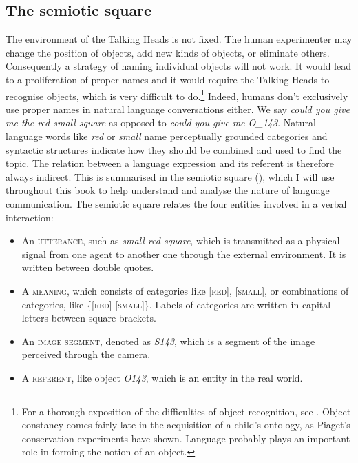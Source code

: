 \subsection{The semiotic square}

The environment of the Talking Heads is 
not fixed. The human experimenter 
may change the position of objects, add new kinds of 
objects, or eliminate
others. Consequently a strategy of naming individual objects
will not work. It would lead to a proliferation of 
proper names and it would require the Talking Heads to
recognise objects, which is very difficult to do.\footnote{For a thorough exposition of the difficulties of 
object recognition, see \cite{Ullman:1996}. 
Object constancy comes fairly late in the 
acquisition of a child's ontology, as Piaget's conservation
experiments have shown. Language probably plays an important
role in forming the notion of an object.}
Indeed, humans don't exclusively use proper names in 
natural language conversations 
either. We say \textit{could you give me the red small square} as 
opposed to \textit{could you give me O\_143}. Natural language
words like \textit{red} or \textit{small} name perceptually grounded categories
and syntactic structures indicate how they should
be combined and used to find the topic. The relation between 
a language expression and its referent is therefore 
always indirect. This is summarised
in the semiotic square (), which I will use throughout this book to 
help understand and analyse the nature of language communication. 
The semiotic square relates the four entities
involved in a verbal interaction: 
\begin{itemize}
\item An {\scshape utterance}, such as \textit{small red square}, which is 
transmitted as a physical 
signal from one agent to another one through the 
external environment. It is written between double quotes. 
\item A {\scshape meaning}, which consists of categories like [\textsc{red}], [\textsc{small}], 
or combinations of categories, like \{[\textsc{red}] [\textsc{small}]\}. Labels of 
categories are written in capital letters between 
square brackets. 
\clearpage
\item An {\scshape image segment}, denoted as \emph{S143}, which is 
a segment of the image perceived through the camera.
\item A {\scshape referent}, like object \emph{O143}, which is 
an entity in the real world. 
\end{itemize}


